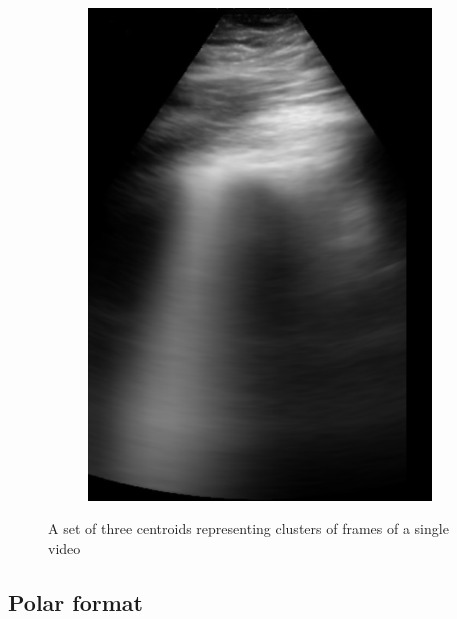 \documentclass[12pt]{article} %
\begin{document}
\begin{figure}
\begin{subfigure}{0.3\textwidth}
		\includegraphics[width=\textwidth]{figuras/centroid_2.jpg}
		\end{subfigure}
	\caption{A set of three centroids representing clusters of frames of a single 		video}
	\end{figure}
	 
\subsection{Polar format}
\end{document}
